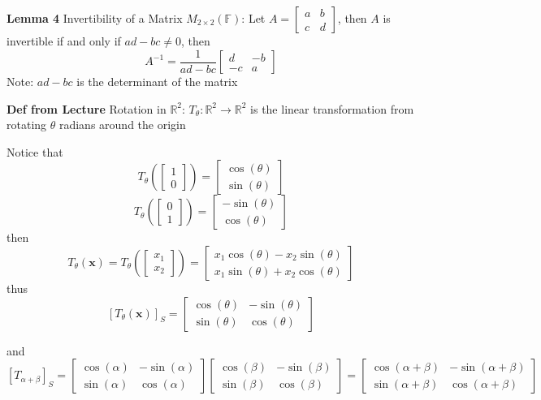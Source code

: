 \documentclass[11pt,notitlepage]{report}
\newcommand{\bb}[1]{\ensuremath{\mathbb{#1}}}
\newcommand{\tbf}[1]{\textbf{#1}}
\begin{document}
\textbf{Lemma 4} Invertibility of a Matrix $M_{2 \times 2}(\bb F)$: Let $A = \begin{bmatrix}a&b\\c&d\end{bmatrix}$, then $A$ is invertible if and only if $ad - bc \ne 0$, then
$$A^{-1} = \frac{1}{ad-bc}\begin{bmatrix}d&-b\\-c&a\end{bmatrix}$$
\hspace*{5mm} Note: $ad - bc$ is the determinant of the matrix


\textbf{Def from Lecture} Rotation in $\bb R^2$: $T_\theta: \bb R^2 \rightarrow \bb R^2$ is the linear transformation from rotating $\theta$ radians around the origin

Notice that
$$T_\theta\left(\begin{bmatrix}1\\0\end{bmatrix}\right) = \begin{bmatrix}\cos(\theta)\\\sin(\theta)\end{bmatrix}$$
$$T_\theta\left(\begin{bmatrix}0\\1\end{bmatrix}\right) = \begin{bmatrix}-\sin(\theta)\\\cos(\theta)\end{bmatrix}$$
then
$$T_\theta(\tbf x) = T_\theta\left(\begin{bmatrix}x_1\\x_2\end{bmatrix}\right) = \begin{bmatrix}x_1\cos(\theta) - x_2\sin(\theta)\\x_1\sin(\theta) + x_2\cos(\theta)\end{bmatrix}$$ thus $$[T_\theta(\tbf x)]_S = \begin{bmatrix}
\cos(\theta) & -\sin(\theta) \\ \sin(\theta) & \cos(\theta)
\end{bmatrix}$$

and
$$[T_{\alpha + \beta}]_S = \begin{bmatrix}
\cos(\alpha) & -\sin(\alpha) \\ \sin(\alpha) & \cos(\alpha)
\end{bmatrix}\begin{bmatrix}
\cos(\beta) & -\sin(\beta) \\ \sin(\beta) & \cos(\beta)
\end{bmatrix} = \begin{bmatrix}
\cos(\alpha + \beta) & -\sin(\alpha + \beta) \\ \sin(\alpha + \beta) & \cos(\alpha + \beta)
\end{bmatrix}$$
\end{document}
